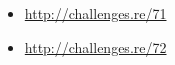 \section{\Exercises}

\begin{itemize}
	\item \url{http://challenges.re/71}
	\item \url{http://challenges.re/72}
\end{itemize}


